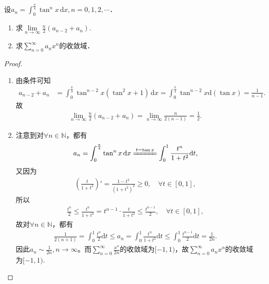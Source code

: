 \documentclass[../../main.tex]{subfiles}%
\begin{document}
\begin{example}
设$a_n = \int_0^{\frac{\pi}{4}} \tan^n x\,\mathrm{d}x, n = 0,1,2,\cdots$．
\begin{enumerate}[(1)]
\item 求$\lim\limits_{n \to \infty} \frac{n}{2}(a_{n-2} + a_n).$

\item 求$\sum\limits_{n=0}^{\infty} a_n x^n$的收敛域．
\end{enumerate}
\end{example}
\begin{proof}
\begin{enumerate}[(1)]
\item 由条件可知
\begin{align*}
a_{n-2} + a_n &= \int_0^{\frac{\pi}{4}} \tan^{n-2}x \left( \tan^2 x + 1 \right)\,\mathrm{d}x = \int_0^{\frac{\pi}{4}} \tan^{n-2}x \mathrm{d}(\tan x) = \frac{1}{n-1}.
\end{align*}
故
\begin{align*}
\lim_{n \to \infty} \frac{n}{2} \left( a_{n-2} + a_n \right) = \lim_{n \to \infty} \frac{n}{2(n-1)} = \frac{1}{2}.
\end{align*}

\item 注意到对$\forall n\in \mathbb{N}$，都有
\begin{align*}
a_n = \int_0^{\frac{\pi}{4}} \tan^n x\,\mathrm{d}x \xlongequal{t = \tan x} \int_0^1 \frac{t^n}{1 + t^2} \mathrm{d}t,
\end{align*}
又因为
\begin{align*}
\left( \frac{t}{1 + t^2} \right)' = \frac{1 - t^2}{(1 + t^2)^2} \geqslant 0,\quad \forall t \in [0,1],
\end{align*}
所以
\begin{align*}
\frac{t^n}{2} \leqslant \frac{t^n}{1 + t^2} = t^{n-1} \cdot \frac{t}{1 + t^2} \leqslant \frac{t^{n-1}}{2}, \quad \forall t \in [0,1],
\end{align*}
故对$\forall n\in \mathbb{N}$，都有
\begin{align*}
\frac{1}{2(n+1)} = \int_0^1 \frac{t^n}{2} \mathrm{d}t \leqslant a_n = \int_0^1 \frac{t^n}{1 + t^2} \mathrm{d}t \leqslant \int_0^1 \frac{t^{n-1}}{2} \mathrm{d}t = \frac{1}{2n}.
\end{align*}
因此$a_n \sim \frac{1}{2n}, n \to \infty$。而$\sum\limits_{n=0}^{\infty} \frac{x^n}{2n}$的收敛域为$[-1,1)$，故$\sum\limits_{n=0}^{\infty} a_n x^n$的收敛域为$[-1,1)$.
\end{enumerate}
\end{proof}
\end{document}
